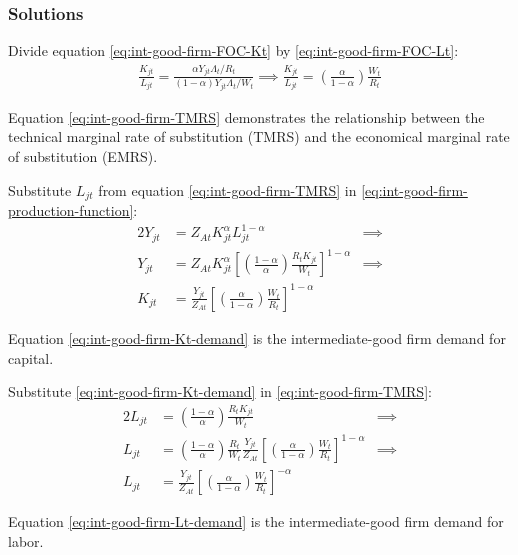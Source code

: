 \documentclass[
	12pt, 
	]{article}
\numberwithin{equation}{section}
\theoremstyle{definition}
\theoremstyle{plain}
\theoremstyle{plain}
\theoremstyle{plain}
\begin{document}
\subsubsection*{Solutions}

Divide equation \ref{eq:int-good-firm-FOC-Kt} by \ref{eq:int-good-firm-FOC-Lt}:
\begin{align}
	\frac{K_{jt}}{L_{jt}} = \frac{\alpha Y_{jt} \Lambda_t /R_t}{(1-\alpha) Y_{jt} \Lambda_t /W_t} \implies
	\frac{K_{jt}}{L_{jt}} = \left( \frac{\alpha}{1-\alpha} \right) \frac{W_t}{R_t} \label{eq:int-good-firm-TMRS}
\end{align}

Equation \ref{eq:int-good-firm-TMRS} demonstrates the relationship between the technical marginal rate of substitution (TMRS) and the economical marginal rate of substitution (EMRS). 

Substitute $L_{jt}$ from equation \ref{eq:int-good-firm-TMRS} in \ref{eq:int-good-firm-production-function}:
\begin{alignat}{2}
	Y_{jt} & = Z_{At} K_{jt}^\alpha L_{jt}^{1-\alpha} &\implies \nonumber \\
	Y_{jt} & = Z_{At} K_{jt}^\alpha \left[ \left( \frac{1-\alpha}{\alpha} \right) \frac{R_t K_{jt}}{W_t} \right]^{1-\alpha} &\implies \nonumber \\
	K_{jt} & = \frac{Y_{jt}}{Z_{At}} \left[ \left( \frac{\alpha}{1-\alpha} \right) \frac{W_t}{R_t}\right]^{1-\alpha} \label{eq:int-good-firm-Kt-demand}
\end{alignat}

Equation \ref{eq:int-good-firm-Kt-demand} is the intermediate-good firm demand for capital. 

Substitute \ref{eq:int-good-firm-Kt-demand} in \ref{eq:int-good-firm-TMRS}:
\begin{alignat}{2}
	L_{jt} & = \left( \frac{1-\alpha}{\alpha} \right) \frac{R_t K_{jt}}{W_t} &\implies \nonumber \\
	L_{jt} & = \left( \frac{1-\alpha}{\alpha} \right) \frac{R_t}{W_t} \frac{Y_{jt}}{Z_{At}} \left[ \left( \frac{\alpha}{1-\alpha} \right) \frac{W_t}{R_t}\right]^{1-\alpha} &\implies \nonumber \\
	L_{jt} & = \frac{Y_{jt}}{Z_{At}} \left[ \left( \frac{\alpha}{1-\alpha} \right) \frac{W_t}{R_t}\right]^{-\alpha} \label{eq:int-good-firm-Lt-demand}
\end{alignat}

Equation \ref{eq:int-good-firm-Lt-demand} is the intermediate-good firm demand for labor.
\end{document}
